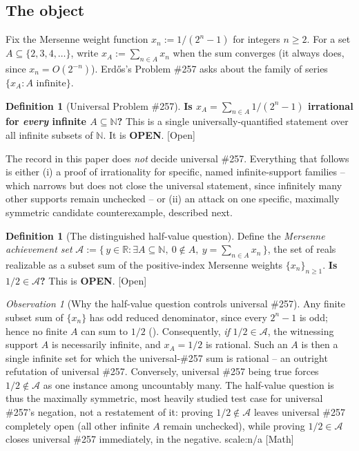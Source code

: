 \documentclass[11pt]{article}
\theoremstyle{plain}
\theoremstyle{definition}
\newtheorem{defn}[thm]{Definition}
\theoremstyle{remark}
\newtheorem{obs}[thm]{Observation}
\newcommand{\lean}[2]{\leanlink{#2}}
\newcommand{\ev}[1]{{\small\textsf{[#1]}}\xspace}
\newcommand{\scale}[1]{{\small\textsf{scale:#1}}\xspace}
\begin{document}
\subsection{The object}

Fix the Mersenne weight function $x_n := 1/(2^n-1)$ for integers $n \ge 2$. For a set
$A \subseteq \{2,3,4,\dots\}$, write $x_A := \sum_{n \in A} x_n$ when the sum converges (it always
does, since $x_n = O(2^{-n})$). Erd\H{o}s's Problem \#257 asks about the family of series
$\{x_A : A \text{ infinite}\}$.

\begin{defn}[Universal Problem \#257]
\textbf{Is $x_A = \sum_{n \in A} 1/(2^n-1)$ irrational for \emph{every} infinite
$A \subseteq \mathbb{N}$?}
This is a single universally-quantified statement over all infinite subsets of $\mathbb{N}$. It is
\textbf{OPEN}. \ev{Open}
\end{defn}

The record in this paper does \emph{not} decide universal \#257. Everything that follows is either
(i) a proof of irrationality for specific, named infinite-support families -- which narrows but
does not close the universal statement, since infinitely many other supports remain unchecked -- or
(ii) an attack on one specific, maximally symmetric candidate counterexample, described next.

\begin{defn}[The distinguished half-value question]
\label{defn:half-question}
Define the \emph{Mersenne achievement set}
$\mathcal{A} := \{\,y \in \mathbb{R} : \exists A \subseteq \mathbb{N},\ 0 \notin A,\ y =
\sum_{n \in A} x_n\,\}$, the set of reals realizable as a subset sum of the positive-index Mersenne
weights $\{x_n\}_{n \ge 1}$. \textbf{Is $1/2 \in \mathcal{A}$?} This is \textbf{OPEN}. \ev{Open}
\end{defn}

\begin{obs}[Why the half-value question controls universal \#257]
\label{obs:half-controls-universal}
Any finite subset sum of $\{x_n\}$ has odd reduced denominator, since every $2^n - 1$ is odd; hence
no finite $A$ can sum to $1/2$ (\lean{positiveMersenneSupportValue_coe_finset_ne_half}{HalfCutLocator.lean:243}).
Consequently, \emph{if} $1/2 \in \mathcal{A}$, the witnessing support $A$ is necessarily infinite, and
$x_A = 1/2$ is rational. Such an $A$ is then a single infinite set for which the universal-\#257
sum is rational -- an outright refutation of universal \#257. Conversely, universal \#257 being true
forces $1/2 \notin \mathcal{A}$ as one instance among uncountably many. The half-value question is
thus the maximally symmetric, most heavily studied test case for universal \#257's negation, not a
restatement of it: proving $1/2 \notin \mathcal{A}$ leaves universal \#257 completely open (all other
infinite $A$ remain unchecked), while proving $1/2 \in \mathcal{A}$ closes universal \#257
immediately, in the negative. \scale{n/a} \ev{Math}
\end{obs}
\end{document}
